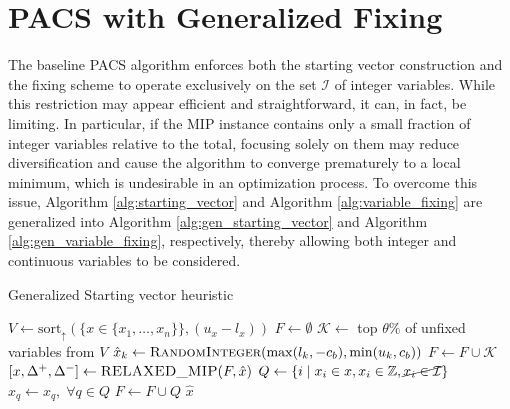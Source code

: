 \section{PACS with Generalized Fixing}\label{sec:gen_fixing}
The baseline PACS algorithm enforces both the starting vector construction and the fixing scheme to operate exclusively on the set $\mathcal{I}$ of integer variables. While this restriction may appear efficient and straightforward, it can, in fact, be limiting. In particular, if the MIP instance contains only a small fraction of integer variables relative to the total, focusing solely on them may reduce diversification and cause the algorithm to converge prematurely to a local minimum, which is undesirable in an optimization process.
To overcome this issue, Algorithm \ref{alg:starting_vector} and Algorithm \ref{alg:variable_fixing} are generalized into Algorithm \ref{alg:gen_starting_vector} and Algorithm \ref{alg:gen_variable_fixing}, respectively, thereby allowing both integer and continuous variables to be considered.
\begin{algorithm}[H]
\caption{Generalized Starting vector heuristic}\label{alg:gen_starting_vector}
\begin{algorithmic}[1]
\State $V \gets \text{sort}_\uparrow(\big \{x \in \{x_1,\dots,x_n\}\big\}, (u_x-l_x))$
\State $F \gets \emptyset$
    \State $\mathcal{K} \gets$ top $\theta \%$ of unfixed variables from $V$
        \State $\hat{x}_k \gets \Call{RandomInteger}{\max(l_k, -c_b), \min(u_k, c_b)}$
    \EndFor
    \State $F \gets F \cup \mathcal{K}$
    \State $[x, \Delta^+, \Delta^-] \gets \Call{RELAXED\_MIP}{F,\hat{x}}$
    \State $Q \gets \{i \;|\; x_i \in x, x_i \in \mathbb{Z},\cancel{x_i \in \mathcal{I}}\}$
    \State $\hat{x}_q \gets x_q, \; \forall q \in Q$
    \State $F \gets F \cup Q$
\EndWhile
\State \Return $\hat{x}$
\EndFunction
\end{algorithmic}
\end{algorithm}
